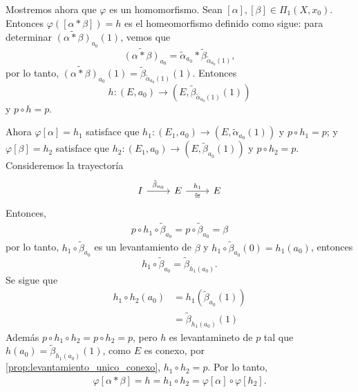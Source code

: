 \begin{dem}
Mostremos ahora que \textit{$\varphi$} es un homomorfismo. Sean $[\alpha], [\beta] \in \Pi_1(X, x_0)$. Entonces $\varphi([\alpha * \beta]) = h$ es el homeomorfismo definido como sigue: para determinar $\widetilde{(\alpha * \beta)}_{a_0}(1)$, vemos que
\[
\widetilde{(\alpha * \beta)}_{a_0} = \tilde{\alpha}_{a_0} * \tilde{\beta}_{\tilde{\alpha}_{a_0}(1)},
\]
por lo tanto, $\widetilde{(\alpha * \beta)}_{a_0}(1) = \tilde{\beta}_{\tilde{\alpha}_{a_0}(1)}(1)$. Entonces
\[
h \colon (E, a_0) \to \left(E, \tilde{\beta}_{\tilde{\alpha}_{a_0}(1)}(1)\right) 
\]
y $ p \circ h = p$.


Ahora $\varphi[\alpha]=h_1$ satisface que $h_1:(E_1,a_0)\to (E,\tilde{\alpha}_{a_0}(1))$ y $p\circ h_1=p$; y $\varphi[\beta]=h_2$ satisface que $h_2:(E_1,a_0)\to (E,\tilde{\beta}_{a_0}(1))$ y $p\circ h_2=p$. Consideremos la trayectoría
\begin{equation*}
    \begin{tikzcd}[column sep=0.85cm]
        I\arrow[r,"\tilde{\beta}_{a_0}"] & E\arrow[r,"h_1","\cong"'] & E
    \end{tikzcd}
\end{equation*}
Entonces,
\begin{align*}
    p\circ h_1\circ \tilde{\beta}_{a_0}=p\circ \tilde{\beta}_{a_0}=\beta
\end{align*}
por lo tanto, $h_1\circ \tilde{\beta}_{a_0}$ es un levantamiento de $\beta$ y $h_1\circ \tilde{\beta}_{a_0}(0)=h_1(a_0)$, entonces 
\begin{equation*}
    h_1\circ \tilde{\beta}_{a_0}=\tilde{\beta}_{h_1(a_0)}.
\end{equation*}
Se sigue que
\begin{align*}
    h_1\circ h_2(a_0)&=h_1(\tilde{\beta}_{a_0}(1))\\
    &=\tilde{\beta}_{h_1(a_0)}(1)
\end{align*}
Además $p\circ h_1\circ h_2=p\circ h_2=p$, pero $h$ es levantamineto de $p$ tal que $h(a_0)=\tilde{\beta}_{h_1(a_0)}(1)$, como $E$ es conexo, por \ref{prop:levantamiento_unico_conexo}, $h_1\circ h_2=p$. Por lo tanto,
\begin{align*}
    \varphi[\alpha*\beta]=h=h_1\circ h_2=\varphi[\alpha]\circ\varphi[h_2].
\end{align*}


\end{dem}
